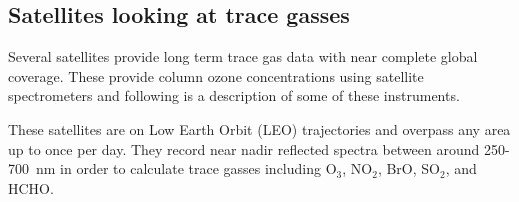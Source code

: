 \subsection{Satellites looking at trace gasses}
Several satellites provide long term trace gas data with near complete global coverage. 
These provide column ozone concentrations using satellite spectrometers and following is a description of some of these instruments.

These satellites are on Low Earth Orbit (LEO) trajectories and overpass any area up to once per day. 
They record near nadir reflected spectra between around 250-700~nm in order to calculate trace gasses including O$_3$, NO$_2$, BrO, SO$_2$, and HCHO.
  
  